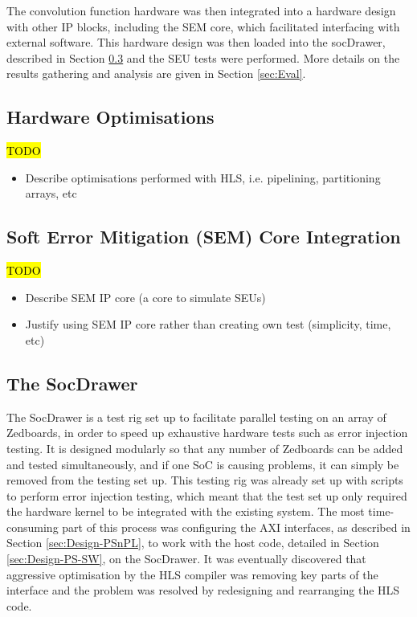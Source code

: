 \documentclass[12pt]{article}
\begin{document}
The convolution function hardware was then integrated into a hardware design with other IP blocks, including the SEM core, which facilitated interfacing with external software. This hardware design was then loaded into the socDrawer, described in Section \ref{sec:Imp-socdrawer} and the SEU tests were performed. More details on the results gathering and analysis are given in Section \ref{sec:Eval}.

\subsection{Hardware Optimisations}
\label{sec:Imp-Optimisations}


\hl{TODO}

\begin{itemize}
\item Describe optimisations performed with HLS, i.e. pipelining, partitioning arrays, etc

\end{itemize}

\subsection{Soft Error Mitigation (SEM) Core Integration}
\label{sec:Imp-SEM}

\hl{TODO}

\begin{itemize}
\item Describe SEM IP core (a core to simulate SEUs)
\item Justify using SEM IP core rather than creating own test (simplicity, time, etc)
\end{itemize}

\subsection{The SocDrawer}
\label{sec:Imp-socdrawer}

The SocDrawer is a test rig set up to facilitate parallel testing on an array of Zedboards, in order to speed up exhaustive hardware tests such as error injection testing. It is designed modularly so that any number of Zedboards can be added and tested simultaneously, and if one SoC is causing problems, it can simply be removed from the testing set up. This testing rig was already set up with scripts to perform error injection testing, which meant that the test set up only required the hardware kernel to be integrated with the existing system. The most time-consuming part of this process was configuring the AXI interfaces, as described in Section \ref{sec:Design-PSnPL}, to work with the host code, detailed in Section \ref{sec:Design-PS-SW}, on the SocDrawer. It was eventually discovered that aggressive optimisation by the HLS compiler was removing key parts of the interface and the problem was resolved by redesigning and rearranging the HLS code.
\end{document}
